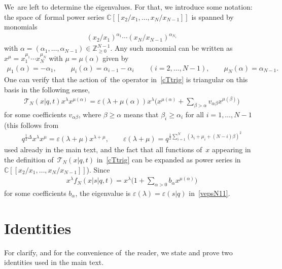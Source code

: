 \documentclass[pdftex]{sigma}%
\numberwithin{equation}{section}
\newcommand{\C}{{\mathbb C}}
\newcommand{\Z}{{\mathbb Z}}
\newcommand{\cT}{{\mathcal T}}
\begin{document}
We~are left to determine the eigenvalues. For that, we introduce some notation: the space of~formal power series $\C[[x_2/x_1,\dots,x_N/x_{N-1}]]$ is spanned by monomials
\begin{gather*}
(x_2/x_1)^{\alpha_1} \cdots (x_N/x_{N-1})^{\alpha_{N_1}}
\end{gather*}
with $\alpha=(\alpha_1,\dots,\alpha_{N-1})\in\Z_{\geq 0}^{N-1}$.
Any such monomial can be written as $x^\mu=x_1^{\mu_1}\cdots x_N^{\mu_N}$ with $\mu=\mu(\alpha)$ given by
\begin{gather*}
\mu_1(\alpha)=-\alpha_1,\qquad \mu_i(\alpha)=\alpha_{i-1}-\alpha_i\qquad (i=2,\dots,N-1),\qquad \mu_N(\alpha)=\alpha_{N-1}.
\end{gather*}
One can verify that the action of~the operator in~\eqref{cTtrig} is triangular on this basis in the following sense,
\begin{gather*}
\cT_N(x|q,t) x^\lambda x^{\mu(\alpha)} = \varepsilon(\lambda+\mu(\alpha))x^\lambda \Bigg( x^{\mu(\alpha)} + \sum_{\beta>\alpha} v_{\alpha\beta} x^{\mu(\beta)} \Bigg)
\end{gather*}
for some coefficients $v_{\alpha\beta}$, where $\beta\geq \alpha$ means that $\beta_i\geq \alpha_i$ for all $i=1,\dots,N-1$ (this follows from
\begin{gather*}
q^{\frac12\Delta} x^\lambda x^{\mu} = \varepsilon(\lambda+\mu)x^{\lambda +\mu} ,\qquad \varepsilon(\lambda+\mu)=q^{\frac12\sum_{i=1}^N(\lambda_i+\mu_i+(N-i)\beta)^2}
\end{gather*}
used already in the main text, and the fact that all functions of~$x$ appearing in the definition of~$\cT_N(x|q,t)$ in~\eqref{cTtrig} can be expanded as power series in $\C[[x_2/x_1,\dots,x_N/x_{N-1}]]$).
Since
\begin{gather*}
x^\lambda f_N(x|s|q,t) = x^\lambda\Bigg( 1 + \sum_{\alpha>0} b_\alpha x^{\mu(\alpha)}\Bigg)
\end{gather*}
for some coefficients $b_\alpha$, the eigenvalue is $\varepsilon(\lambda)=\varepsilon(s|q)$ in~\eqref{vepsN11}.

\section{Identities}\label{app:Id}
For clarify, and for the convenience of~the reader, we state and prove two identities used in the main text.
\end{document}
